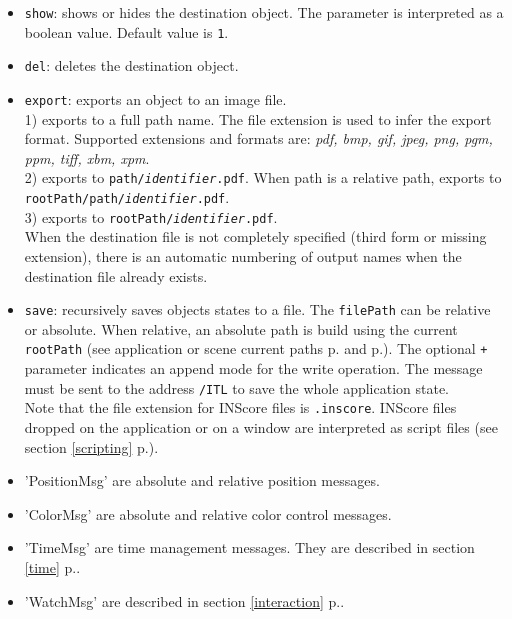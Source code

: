 \documentclass[a4paper,twoside]{report}
\newcommand{\fullref}[1]	{\ref{#1} p.\pageref{#1}}
\newcommand{\OSC}[1]		{\texttt{#1}}
\newcommand{\values}[1]	{\texttt{#1}}
\begin{document}
\begin{itemize}
\item \OSC{show}: shows or hides the destination object. The parameter is interpreted as a boolean value. Default value is \values{1}. 
\item \OSC{del}: deletes the destination object. 

\item \OSC{export}: exports an object to an image file. \\
1) exports to a full path name. The file extension is used to infer the export format. Supported extensions and formats are: \emph{pdf, bmp, gif, jpeg, png, pgm, ppm, tiff, xbm, xpm}. \\
2) exports to \OSC{path/\textit{identifier}.pdf}. When path is a relative path, exports to \OSC{rootPath/path/\textit{identifier}.pdf}. \\
3) exports to \OSC{rootPath/\textit{identifier}.pdf}.\\
When the destination file is not completely specified (third form or missing extension), there is an automatic numbering of output names when the destination file already exists.

\item \OSC{save}: recursively saves objects states to a file.  The \OSC{filePath} can be relative or absolute. When relative, an absolute path is build using the current \OSC{rootPath} (see application or scene current paths  p.\pageref{applmgmt} and  p.\pageref{scene}). The optional \OSC{+} parameter indicates an append mode for the write operation. The message must be sent to the address \OSC{/ITL} to save the whole application state.\\
Note that the file extension for INScore files is \OSC{.inscore}. INScore files dropped on the application or on a window are interpreted as script files (see section \fullref{scripting}).

\item 'PositionMsg' are absolute and relative position messages.
\item 'ColorMsg' are absolute and relative color control messages.
\item 'TimeMsg' are time management messages. They are described in section \fullref{time}.
\item 'WatchMsg' are described in section \fullref{interaction}.
\end{itemize}
\end{document}
